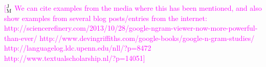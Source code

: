 \documentclass[11pt]{article}
\newcommand{\jmcomment}[1]{\textcolor{magenta}{[$^{\textsc{J}}_{\textsc{M}}$ #1]}}
\begin{document}
\jmcomment{We can cite examples from the media where this has been mentioned, and also show examples from several blog posts/entries from the internet:
http://sciencerefinery.com/2013/10/28/google-ngram-viewer-now-more-powerful-than-ever/
http://www.devingriffiths.com/google-books/google-n-gram-studies/
http://languagelog.ldc.upenn.edu/nll/?p=8472
http://www.textualscholarship.nl/?p=14051}



\end{document}
